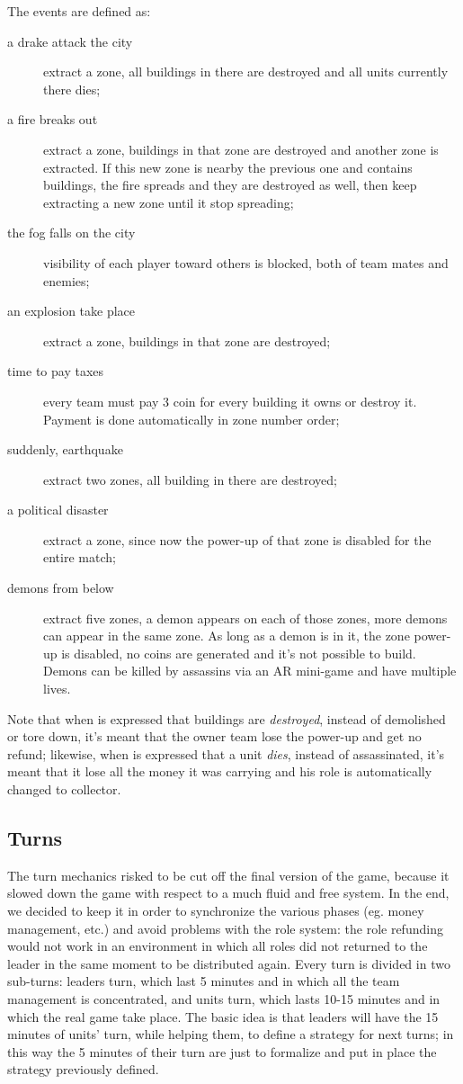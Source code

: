 			The events are defined as:
			\begin{description}
				\item[a drake attack the city] extract a zone, all buildings in there are destroyed and all units currently there dies;
				\item[a fire breaks out] extract a zone, buildings in that zone are destroyed and another zone is extracted. If this new zone is nearby the previous one and contains buildings, the fire spreads and they are destroyed as well, then keep extracting a new zone until it stop spreading;
				\item[the fog falls on the city] visibility of each player toward others is blocked, both of team mates and enemies;
				\item[an explosion take place] extract a zone, buildings in that zone are destroyed;
				\item[time to pay taxes] every team must pay 3 coin for every building it owns or destroy it. Payment is done automatically in zone number order;
				\item[suddenly, earthquake] extract two zones, all building in there are destroyed;
				\item[a political disaster] extract a zone, since now the power-up of that zone is disabled for the entire match;
				\item[demons from below] extract five zones, a demon appears on each of those zones, more demons can appear in the same zone. As long as a demon is in it, the zone power-up is disabled, no coins are generated and it's not possible to build. Demons can be killed by assassins via an AR mini-game and have multiple lives.
			\end{description}
			
			Note that when is expressed that buildings are \emph{destroyed}, instead of demolished or tore down, it's meant that the owner team lose the power-up and get no refund; likewise, when is expressed that a unit \emph{dies}, instead of assassinated, it's meant that it lose all the money it was carrying and his role is automatically changed to collector.
			
			
		\subsection{Turns}
		
			The turn mechanics risked to be cut off the final version of the game, because it slowed down the game with respect to a much fluid and free system.
			In the end, we decided to keep it in order to synchronize the various phases (eg. money management, etc.) and avoid problems with the role system: the role refunding would not work in an environment in which all roles did not returned to the leader in the same moment to be distributed again.
			Every turn is divided in two sub-turns: leaders turn, which last 5 minutes and in which all the team management is concentrated, and units turn, which lasts 10-15 minutes and in which the real game take place.
			The basic idea is that leaders will have the 15 minutes of units' turn, while helping them, to define a strategy for next turns; in this way the 5 minutes of their turn are just to formalize and put in place the strategy previously defined.
			
